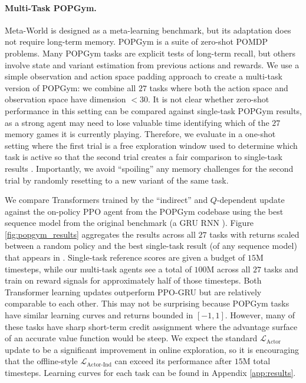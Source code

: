 \paragraph{Multi-Task POPGym.} Meta-World is designed as a meta-learning benchmark, but its adaptation does not require long-term memory. POPGym \cite{morad2023popgym} is a suite of zero-shot POMDP problems. Many POPGym tasks are explicit tests of long-term recall, but others involve state and variant estimation from previous actions and rewards. We use a simple observation and action space padding approach to create a multi-task version of POPGym: we combine all $27$ tasks where both the action space and observation space have dimension $< 30$. It is not clear whether zero-shot performance in this setting can be compared against single-task POPGym results, as a strong agent may need to lose valuable time identifying which of the $27$ memory games it is currently playing. Therefore, we evaluate in a one-shot setting where the first trial is a free exploration window used to determine which task is active so that the second trial creates a fair comparison to single-task results \cite{stadie2018some}. Importantly, we avoid ``spoiling'' any memory challenges for the second trial by randomly resetting to a new variant of the same task.

We compare Transformers trained by the ``indirect'' and $Q$-dependent update against the on-policy PPO agent from the POPGym codebase \cite{morad2023popgym} using the best sequence model from the original benchmark (a GRU RNN \cite{cho2014learning}). Figure \ref{fig:popgym_results} aggregates the results across all $27$ tasks with returns scaled between a random policy and the best single-task result (of any sequence model) that appears in \citet{morad2024reinforcement}. Single-task reference scores are given a budget of $15$M timesteps, while our multi-task agents see a total of $100$M across all $27$ tasks and train on reward signals for approximately half of those timesteps. Both Transformer learning updates outperform PPO-GRU but are relatively comparable to each other. This may not be surprising because POPGym tasks have similar learning curves and returns bounded in $[-1, 1]$. However, many of these tasks have sharp short-term credit assignment where the advantage surface of an accurate value function would be steep. We expect the standard $\mathcal{L}_{\text{Actor}}$ update to be a significant improvement in online exploration, so it is encouraging that the offline-style $\mathcal{L}_{\text{Actor-Ind}}$ can exceed its performance after $15$M total timesteps. Learning curves for each task can be found in Appendix \ref{app:results}.


